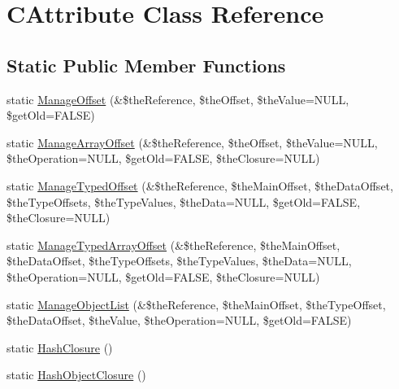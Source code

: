 \hypertarget{class_c_attribute}{\section{C\-Attribute Class Reference}
\label{class_c_attribute}
}
\subsection*{Static Public Member Functions}
\begin{DoxyCompactItemize}
\item 
static \hyperlink{class_c_attribute_a9d231a47718719fcd6c33f3d0ac91675}{Manage\-Offset} (\&\$the\-Reference, \$the\-Offset, \$the\-Value=N\-U\-L\-L, \$get\-Old=F\-A\-L\-S\-E)
\item 
static \hyperlink{class_c_attribute_ace756c1a8832932ec135104223d1e50c}{Manage\-Array\-Offset} (\&\$the\-Reference, \$the\-Offset, \$the\-Value=N\-U\-L\-L, \$the\-Operation=N\-U\-L\-L, \$get\-Old=F\-A\-L\-S\-E, \$the\-Closure=N\-U\-L\-L)
\item 
static \hyperlink{class_c_attribute_a200333aed4419e123658883a9e4495e2}{Manage\-Typed\-Offset} (\&\$the\-Reference, \$the\-Main\-Offset, \$the\-Data\-Offset, \$the\-Type\-Offsets, \$the\-Type\-Values, \$the\-Data=N\-U\-L\-L, \$get\-Old=F\-A\-L\-S\-E, \$the\-Closure=N\-U\-L\-L)
\item 
static \hyperlink{class_c_attribute_ae7dab1c13d4bb99d6d7a3d6a657f6750}{Manage\-Typed\-Array\-Offset} (\&\$the\-Reference, \$the\-Main\-Offset, \$the\-Data\-Offset, \$the\-Type\-Offsets, \$the\-Type\-Values, \$the\-Data=N\-U\-L\-L, \$the\-Operation=N\-U\-L\-L, \$get\-Old=F\-A\-L\-S\-E, \$the\-Closure=N\-U\-L\-L)
\item 
static \hyperlink{class_c_attribute_a58d5de30d4a6ea29f485a266460a2bdd}{Manage\-Object\-List} (\&\$the\-Reference, \$the\-Main\-Offset, \$the\-Type\-Offset, \$the\-Data\-Offset, \$the\-Value, \$the\-Operation=N\-U\-L\-L, \$get\-Old=F\-A\-L\-S\-E)
\item 
static \hyperlink{class_c_attribute_af3647cf0f23e104446fa8ddf082461d7}{Hash\-Closure} ()
\item 
static \hyperlink{class_c_attribute_af1aaa0ec9aece43228c0ffa781fcccb3}{Hash\-Object\-Closure} ()
\end{DoxyCompactItemize}


